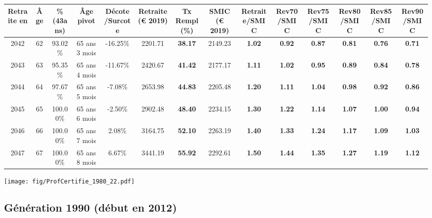 \begin{adjustbox}{max width=\textwidth} 
\begin{tabular}[htb]{|c|c||c|c|c||c|c||c||c|c|c|c|c|c|} 
\hline 
 Retraite en &  Âge &  \%(43ans) &  Âge pivot &  Décote/Surcote &  Retraite (\euro{} 2019) &  Tx Rempl(\%) &  SMIC (\euro{} 2019) &  Retraite/SMIC &  Rev70/SMIC &  Rev75/SMIC &  Rev80/SMIC &  Rev85/SMIC &  Rev90/SMIC \\ 
\hline \hline 
 2042 &  62 &  93.02\% &  65 ans 3 mois &  -16.25\% &  2201.71 &  {\bf 38.17} &  2149.23 &  {\bf 1.02} &  {\bf {\color{red} 0.92}} &  {\bf {\color{red} 0.87}} &  {\bf {\color{red} 0.81}} &  {\bf {\color{red} 0.76}} &  {\bf {\color{red} 0.71}} \\ 
\hline 
 2043 &  63 &  95.35\% &  65 ans 4 mois &  -11.67\% &  2420.67 &  {\bf 41.42} &  2177.17 &  {\bf 1.11} &  {\bf 1.02} &  {\bf {\color{red} 0.95}} &  {\bf {\color{red} 0.89}} &  {\bf {\color{red} 0.84}} &  {\bf {\color{red} 0.78}} \\ 
\hline 
 2044 &  64 &  97.67\% &  65 ans 5 mois &  -7.08\% &  2653.98 &  {\bf 44.83} &  2205.48 &  {\bf 1.20} &  {\bf 1.11} &  {\bf 1.04} &  {\bf {\color{red} 0.98}} &  {\bf {\color{red} 0.92}} &  {\bf {\color{red} 0.86}} \\ 
\hline 
 2045 &  65 &  100.00\% &  65 ans 6 mois &  -2.50\% &  2902.48 &  {\bf 48.40} &  2234.15 &  {\bf 1.30} &  {\bf 1.22} &  {\bf 1.14} &  {\bf 1.07} &  {\bf 1.00} &  {\bf {\color{red} 0.94}} \\ 
\hline 
 2046 &  66 &  100.00\% &  65 ans 7 mois &  2.08\% &  3164.75 &  {\bf 52.10} &  2263.19 &  {\bf 1.40} &  {\bf 1.33} &  {\bf 1.24} &  {\bf 1.17} &  {\bf 1.09} &  {\bf 1.03} \\ 
\hline 
 2047 &  67 &  100.00\% &  65 ans 8 mois &  6.67\% &  3441.19 &  {\bf 55.92} &  2292.61 &  {\bf 1.50} &  {\bf 1.44} &  {\bf 1.35} &  {\bf 1.27} &  {\bf 1.19} &  {\bf 1.12} \\ 
\hline 
\hline 
\end{tabular} 
\end{adjustbox} 
 
 \vspace{0.1cm} 

 \begin{center}\texttt{[image: fig/ProfCertifie\_1980\_22.pdf]}\end{center} \label{fig/ProfCertifie_1980_22.pdf} 

\newpage 
 
\subsection{Génération 1990 (début en 2012)} 


